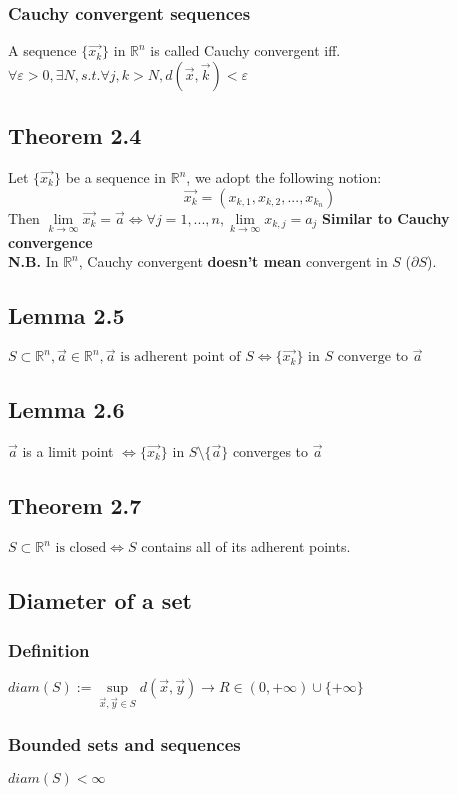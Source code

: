 \documentclass[11pt, a4paper]{article}
\begin{document}
        \subsubsection{Cauchy convergent sequences}
        A sequence $\{\vec{x_k}\} \text{ in } \mathbb{R}^n$ is called Cauchy convergent iff. $\forall \varepsilon > 0, \exists N, s.t. \forall j, k > N, d(\vec{x}, \vec{k}) < \varepsilon$
    \subsection{Theorem 2.4}
    Let $\{\vec{x_k}\}$ be a sequence in $\mathbb{R}^n$, we adopt the following notion: 
    $$\vec{x_k} = (x_{k, 1}, x_{k, 2}, ..., x_{k_n})$$
    Then $\lim\limits_{k \to \infty} \vec{x_k} = \vec{a} \Leftrightarrow \forall j = 1, ..., n, \lim\limits_{k \to \infty} x_{k, j} = a_j$ \textbf{Similar to Cauchy convergence} \\
    \textbf{N.B.} In $\mathbb{R}^n$, Cauchy convergent \textbf{doesn't mean} convergent in $S$ ($\partial S$).
    \subsection{Lemma 2.5}
        $S \subset \mathbb{R}^n, \vec{a} \in \mathbb{R}^n, \vec{a} \text{ is adherent point of } S \Leftrightarrow \{\vec{x_k}\} \text{ in } S \text{ converge to } \vec{a}$
    \subsection{Lemma 2.6}
        $\vec{a}$ is a limit point $\Leftrightarrow \{\vec{x_k}\} \text{ in } S \setminus \{\vec{a} \}$ converges to $\vec{a}$
    \subsection{Theorem 2.7}
    $S \subset \mathbb{R}^n \text{ is closed} \Leftrightarrow S$ contains all of its adherent points.
    \subsection{Diameter of a set}
        \subsubsection{Definition}
        $diam(S) := \sup\limits_{\vec{x}, \vec{y} \in S} d(\vec{x}, \vec{y}) \to R \in (0, +\infty) \cup \{+\infty\}$
        \subsubsection{Bounded sets and sequences}
        $diam(S) < \infty$
\end{document}
